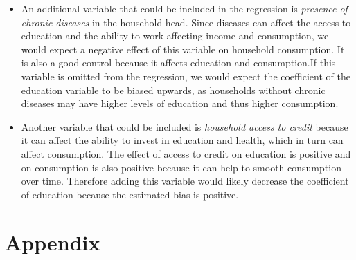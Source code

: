 \documentclass[
  letterpaper,
  DIV=11,
  numbers=noendperiod]{scrartcl}
\providecommand{\tightlist}{%
  \setlength{\itemsep}{0pt}\setlength{\parskip}{0pt}}
\begin{document}
\begin{itemize}
\tightlist
\item
  An additional variable that could be included in the regression is
  \emph{presence of chronic diseases} in the household head. Since
  diseases can affect the access to education and the ability to work
  affecting income and consumption, we would expect a negative effect of
  this variable on household consumption. It is also a good control
  because it affects education and consumption.If this variable is
  omitted from the regression, we would expect the coefficient of the
  education variable to be biased upwards, as households without chronic
  diseases may have higher levels of education and thus higher
  consumption.
\item
  Another variable that could be included is \emph{household access to
  credit} because it can affect the ability to invest in education and
  health, which in turn can affect consumption. The effect of access to
  credit on education is positive and on consumption is also positive
  because it can help to smooth consumption over time. Therefore adding
  this variable would likely decrease the coefficient of education
  because the estimated bias is positive.
\end{itemize}

\section{Appendix}\label{appendix}
\end{document}
